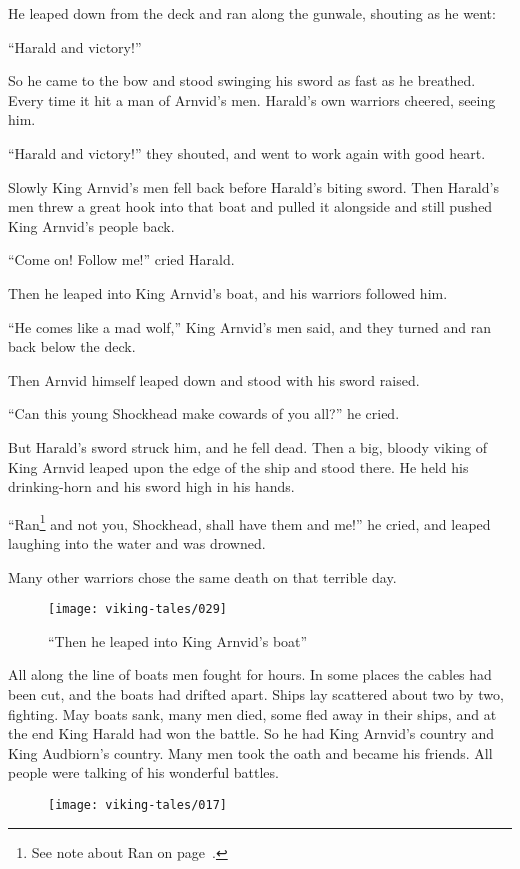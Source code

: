 He leaped down from the deck and ran along the gunwale, shouting as he
went:

``Harald and victory!''

So he came to the bow and stood swinging his sword as fast as he
breathed. Every time it hit a man of Arnvid's men. Harald's own warriors
cheered, seeing him.

``Harald and victory!'' they shouted, and went to work again with good
heart.

Slowly King Arnvid's men fell back before Harald's biting sword. Then
Harald's men threw a great hook into that boat and pulled it alongside
and still pushed King Arnvid's people back.

``Come on! Follow me!'' cried Harald.

Then he leaped into King Arnvid's boat, and his warriors followed him.

``He comes like a mad wolf,'' King Arnvid's men said, and they turned
and ran back below the deck.

Then Arnvid himself leaped down and stood with his sword raised.

``Can this young Shockhead make cowards of you all?'' he cried.

But Harald's sword struck him, and he fell dead. Then a big, bloody
viking of King Arnvid leaped upon the edge of the ship and stood there.
He held his drinking-horn and his sword high in his hands.

``Ran\footnote{See note about Ran on page~\pageref{ran}.} and not you,
Shockhead, shall have them and me!'' he cried, and leaped laughing into
the water and was drowned.

Many other warriors chose the same death on that terrible day.

\begin{figure}[ht]
    \centering
    \texttt{[image: viking-tales/029]}
    \caption{``Then he leaped into King Arnvid's boat''}
\end{figure}

All along the line of boats men fought for hours. In some places the
cables had been cut, and the boats had drifted apart. Ships lay
scattered about two by two, fighting. May boats sank, many men died,
some fled away in their ships, and at the end King Harald had won the
battle. So he had King Arnvid's country and King Audbiorn's country.
Many men took the oath and became his friends. All people were talking
of his wonderful battles.

\begin{figure}[hb]
    \centering
    \vskip8pt
    \texttt{[image: viking-tales/017]}
\end{figure}
